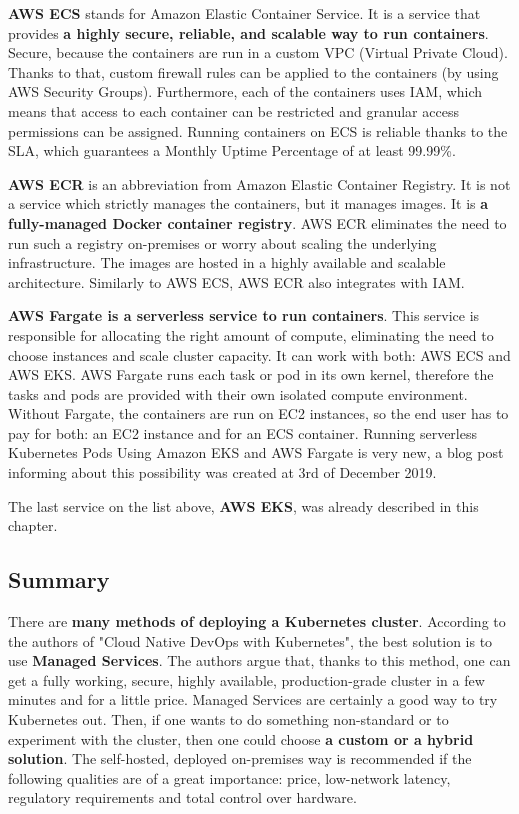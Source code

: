 \textbf{AWS ECS} stands for Amazon Elastic Container Service. It is a service that provides \textbf{a highly secure, reliable, and scalable way to run containers}. Secure, because the containers are run in a custom VPC (Virtual Private Cloud). Thanks to that, custom firewall rules can be applied to the containers (by using AWS Security Groups). Furthermore, each of the containers uses IAM, which means that access to each container can be restricted and granular access permissions can be assigned. Running containers on ECS is reliable thanks to the SLA, which guarantees a Monthly Uptime Percentage of at least 99.99\%\cite{ecs}.

\textbf{AWS ECR} is an abbreviation from Amazon Elastic Container Registry. It is not a service which strictly manages the containers, but it manages images. It is \textbf{a fully-managed Docker container registry}. AWS ECR eliminates the need to run such a registry on-premises or worry about scaling the underlying infrastructure. The images are hosted in a highly available and scalable architecture. Similarly to AWS ECS, AWS ECR also integrates with IAM\cite{ecr}.

\textbf{AWS Fargate is a serverless service to run containers}. This service is responsible for allocating the right amount of compute, eliminating the need to choose instances and scale cluster capacity. It can work with both: AWS ECS and AWS EKS. AWS Fargate runs each task or pod in its own kernel, therefore the tasks and pods are provided with their own isolated compute environment. Without Fargate, the containers are run on EC2 instances, so the end user has to pay for both: an EC2 instance and for an ECS container\cite{fargate}. Running serverless Kubernetes Pods Using Amazon EKS and AWS Fargate is very new, a blog post informing about this possibility was created at 3rd of December 2019\cite{fargate-for-eks}.

The last service on the list above, \textbf{AWS EKS}, was already described in this chapter.

\subsection{Summary}

There are \textbf{many methods of deploying a Kubernetes cluster}. According to the authors of "Cloud Native DevOps with Kubernetes"\cite{book-cndwk}, the best solution is to use \textbf{Managed Services}. The authors argue that, thanks to this method, one can get a fully working, secure, highly available, production-grade cluster in a few minutes and for a little price. Managed Services are certainly a good way to try Kubernetes out. Then, if one wants to do something non-standard or to experiment with the cluster, then one could choose \textbf{a custom or a hybrid solution}. The self-hosted, deployed on-premises way is recommended if the following qualities are of a great importance: price, low-network latency, regulatory requirements and total control over hardware\cite{book-mastering-k8s}.

